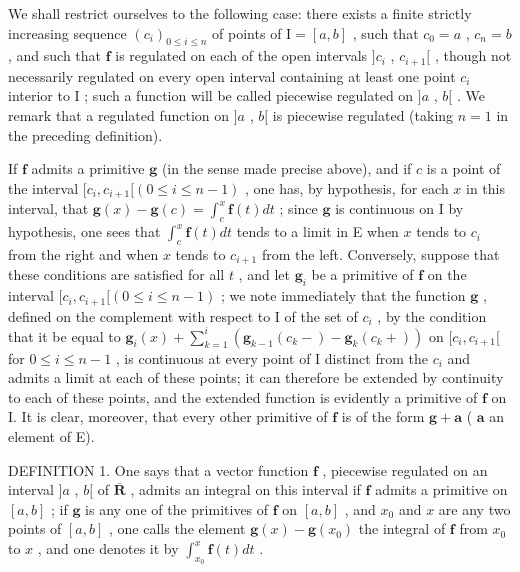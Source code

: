 We shall restrict ourselves to the following case: there exists a finite strictly increasing sequence \((c_i)_{0\leqslant i\leqslant n}\) of points of \(\mathrm{I} = [a,b]\) , such that \(c_0 = a\) , \(c_n = b\) , and such that \(\mathbf{f}\) is regulated on each of the open intervals \(]c_i\) , \(c_{i + 1}[\) , though not necessarily regulated on every open interval containing at least one point \(c_i\) interior to \(\mathrm{I}\) ; such a function will be called piecewise regulated on \(]a\) , \(b[\) . We remark that a regulated function on \(]a\) , \(b[\) is piecewise regulated (taking \(n = 1\) in the preceding definition).

If \(\mathbf{f}\) admits a primitive \(\mathbf{g}\) (in the sense made precise above), and if \(c\) is a point of the interval \([c_i, c_{i+1}[(0 \leqslant i \leqslant n-1)\) , one has, by hypothesis, for each \(x\) in this interval, that \(\mathbf{g}(x) - \mathbf{g}(c) = \int_c^x \mathbf{f}(t) dt\) ; since \(\mathbf{g}\) is continuous on I by hypothesis, one sees that \(\int_c^x \mathbf{f}(t) dt\) tends to a limit in E when \(x\) tends to \(c_i\) from the right and when \(x\) tends to \(c_{i+1}\) from the left. Conversely, suppose that these conditions are satisfied for all \(t\) , and let \(\mathbf{g}_i\) be a primitive of \(\mathbf{f}\) on the interval \([c_i, c_{i+1}[(0 \leqslant i \leqslant n-1)\) ; we note immediately that the function \(\mathbf{g}\) , defined on the complement with respect to I of the set of \(c_i\) , by the condition that it be equal to \(\mathbf{g}_i(x) + \sum_{k=1}^i (\mathbf{g}_{k-1}(c_k-) - \mathbf{g}_k(c_k+))\) on \([c_i, c_{i+1}[\) for \(0 \leqslant i \leqslant n-1\) , is continuous at every point of I distinct from the \(c_i\) and admits a limit at each of these points; it can therefore be extended by continuity to each of these points, and the extended function is evidently a primitive of \(\mathbf{f}\) on I. It is clear, moreover, that every other primitive of \(\mathbf{f}\) is of the form \(\mathbf{g} + \mathbf{a}\) ( \(\mathbf{a}\) an element of E).

DEFINITION 1. One says that a vector function \(\mathbf{f}\) , piecewise regulated on an interval \(]a\) , \(b[\) of \(\overline{\mathbf{R}}\) , admits an integral on this interval if \(\mathbf{f}\) admits a primitive on \([a, b]\) ; if \(\mathbf{g}\) is any one of the primitives of \(\mathbf{f}\) on \([a, b]\) , and \(x_0\) and \(x\) are any two points of \([a, b]\) , one calls the element \(\mathbf{g}(x) - \mathbf{g}(x_0)\) the integral of \(\mathbf{f}\) from \(x_0\) to \(x\) , and one denotes it by \(\int_{x_0}^x \mathbf{f}(t) dt\) .

